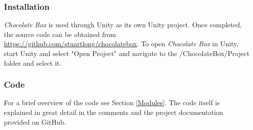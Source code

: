 \documentclass[pdftex,12pt,letter]{article}
\begin{document}
\subsubsection{Installation}
\textit{Chocolate Box} is used through Unity as its own Unity project. Once completed, the source code can be obtained from \url{https://github.com/stuartlong/chocolatebox}. To open \textit{Chocolate Box} in Unity, start Unity and select "Open Project" and navigate to the /ChocolateBox/Project folder and select it.
\subsubsection{Code}
For a brief overview of the code see Section \ref{Modules}. The code itself is explained in great detail in the comments and the project documentation provided on GitHub.

\FloatBarrier
\end{document}
